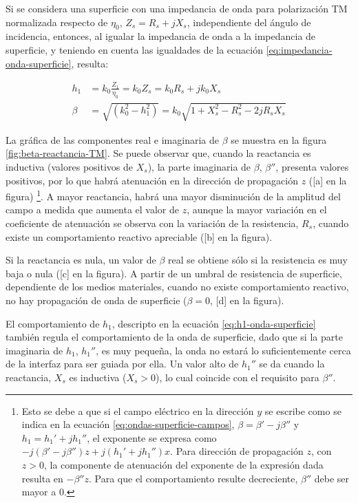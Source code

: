 Si se considera una superficie con una impedancia de onda para polarización TM normalizada respecto de $\eta_0$, $Z_s = R_s + j X_s$, independiente del ángulo de incidencia, entonces, al igualar la impedancia de onda a la impedancia de superficie, y teniendo en cuenta las igualdades de la ecuación \ref{eq:impedancia-onda-superficie}, resulta:

\begin{align}
	h_1 & = k_0 \frac{Z_1}{\eta_0} = k_0 Z_s = k_0 R_s + j k_0 X_s \label{eq:h1-onda-superficie}\\
	\beta &= \sqrt{(k_0^2 - h_1^2)} = k_0 \sqrt{1+X_s^2 - R_s^2 - 2jR_s X_s} \label{eq:beta-onda-superficie}
\end{align}

La gráfica de las componentes real e imaginaria de $\beta$ se muestra en la figura \ref{fig:beta-reactancia-TM}. Se puede observar que, cuando la reactancia es inductiva (valores positivos de $X_s$), la parte imaginaria de $\beta$, $\beta''$, presenta valores positivos, por lo que habrá atenuación en la dirección de propagación $z$ ([a] en la figura) \footnote{Esto se debe a que si el campo eléctrico en la dirección $y$ se escribe como se indica en la ecuación \ref{eq:ondas-superficie-campos}, $\beta=\beta'-j\beta''$ y $h_1 = h_1'+jh_1''$, el exponente se expresa como $-j(\beta'-j\beta'')z + j(h_1'+jh_1'')x$. Para dirección de propagación $z$, con $z>0$, la componente de atenuación del exponente de la expresión dada resulta en $-\beta'' z$. Para que el comportamiento resulte decreciente, $\beta''$ debe ser mayor a $0$.}. A mayor reactancia, habrá una mayor disminución de la amplitud del campo a medida que aumenta el valor de $z$, aunque la mayor variación en el coeficiente de atenuación se observa con la variación de la resistencia, $R_s$, cuando existe un comportamiento reactivo apreciable ([b] en la figura).

Si la reactancia es nula, un valor de $\beta$ real se obtiene sólo si la resistencia es muy baja o nula ([c] en la figura). A partir de un umbral de resistencia de superficie, dependiente de los medios materiales, cuando no existe comportamiento reactivo, no hay propagación de onda de superficie ($\beta=0$, [d] en la figura).

El comportamiento de $h_1$, descripto en la ecuación \ref{eq:h1-onda-superficie} también regula el comportamiento de la onda de superficie, dado que si la parte imaginaria de $h_1$, $h_1''$, es muy pequeña, la onda no estará lo suficientemente cerca de la interfaz para ser guiada por ella. Un valor alto de $h_1''$ se da cuando la reactancia, $X_s$ es inductiva ($X_s>0$), lo cual coincide con el requisito para $\beta''$.

